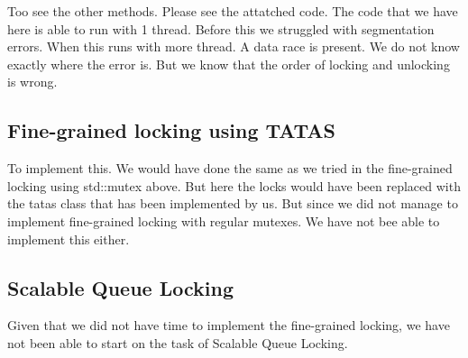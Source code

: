 Too see the other methods. Please see the attatched code.
The code that we have here is able to run with 1 thread. Before this
we struggled with segmentation errors. When this runs with more thread. A data
race is present. We do not know exactly where the error is. But we know that the
order of locking and unlocking is wrong.

\subsection{Fine-grained locking using TATAS}

To implement this. We would have done the same as we tried in the fine-grained 
locking using std::mutex above. But here the locks would have been replaced with
the tatas class that has been implemented by us. But since we did not 
manage to implement fine-grained locking with regular mutexes. We have not bee
able to implement this either.

\subsection{Scalable Queue Locking}

Given that we did not have time to implement the fine-grained locking,
we have not been able to start on the task of Scalable Queue Locking.